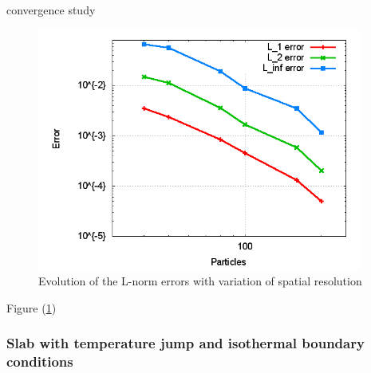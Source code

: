 \documentclass{report}
\begin{document}
convergence study

\begin{figure}[h]  
  \label{fig:PureHeat_ErrorResolution}
  \centering
  \includegraphics[width=0.95\textwidth]{Graphics/results/PureHeatConduction/ErrorResolution}
  \caption{Evolution of the L-norm errors with variation of spatial resolution}
\end{figure}
Figure (\ref{fig:PureHeat_ErrorResolution})




\subsubsection{Slab with temperature jump and isothermal boundary conditions}
\label{sec:pureHeat_Results_isothermal_slab}
\end{document}

